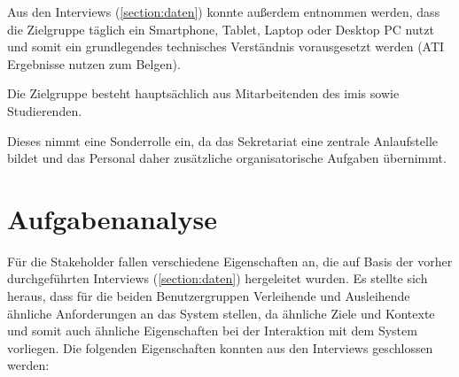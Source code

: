 Aus den Interviews (\ref{section:daten}) konnte außerdem entnommen werden, dass
die Zielgruppe täglich ein Smartphone, Tablet, Laptop oder Desktop PC nutzt und
somit ein grundlegendes technisches Verständnis vorausgesetzt werden (ATI
Ergebnisse nutzen zum Belgen).


Die Zielgruppe besteht hauptsächlich aus Mitarbeitenden des \ac{imis} sowie
Studierenden.


Dieses nimmt eine Sonderrolle ein, da das Sekretariat eine zentrale Anlaufstelle
bildet und das Personal daher zusätzliche organisatorische Aufgaben übernimmt.



\section{Aufgabenanalyse}
\label{section:aufgaben}

Für die Stakeholder fallen verschiedene Eigenschaften an, die auf Basis der
vorher durchgeführten Interviews (\ref{section:daten}) hergeleitet wurden. Es
stellte sich heraus, dass für die beiden Benutzergruppen \glqq
Verleihende\grqq{} und \glqq Ausleihende\grqq{} ähnliche Anforderungen an das
System stellen, da ähnliche Ziele und Kontexte und somit auch ähnliche
Eigenschaften bei der Interaktion mit dem System vorliegen. Die folgenden
Eigenschaften konnten aus den Interviews geschlossen werden:

